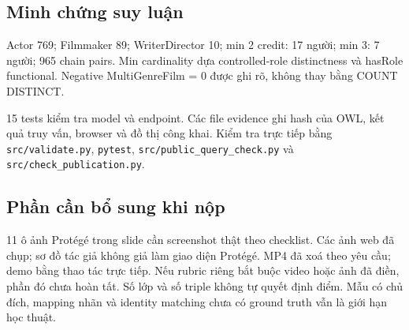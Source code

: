 \documentclass[
  11pt,
]{article}
\begin{document}
\subsection{Minh chứng suy luận}\label{minh-chux1ee9ng-suy-luux1eadn}

Actor 769; Filmmaker 89; Writer\allowbreak{}Di\allowbreak{}rector 10;
min 2 credit: 17 người; min 3: 7 người; 965 chain pairs. Min cardinality
dựa controll\allowbreak{}ed-\allowbreak{}role distinctness và hasRole
functional. Negative
Multi\allowbreak{}Gen\allowbreak{}re\allowbreak{}Film = 0 được ghi rõ,
không thay bằng COUNT DISTINCT.

15 tests kiểm tra model và endpoint. Các file evidence ghi hash của OWL,
kết quả truy vấn, browser và đồ thị công khai. Kiểm tra trực tiếp bằng
\texttt{src/\allowbreak{}vali\allowbreak{}date.\allowbreak{}py},
\texttt{pytest},
\texttt{src/\allowbreak{}publ\allowbreak{}ic\_\allowbreak{}query\allowbreak{}\_\allowbreak{}check.\allowbreak{}p\allowbreak{}y}
và
\texttt{src/\allowbreak{}chec\allowbreak{}k\_\allowbreak{}public\allowbreak{}ation.\allowbreak{}py\allowbreak{}}.

\subsection{Phần cần bổ sung khi
nộp}\label{phux1ea7n-cux1ea7n-bux1ed5-sung-khi-nux1ed9p}

11 ô ảnh Protégé trong slide cần screenshot thật theo checklist. Các ảnh
web đã chụp; sơ đồ tác giả không giả làm giao diện Protégé. MP4 đã xoá
theo yêu cầu; demo bằng thao tác trực tiếp. Nếu rubric riêng bắt buộc
video hoặc ảnh đã điền, phần đó chưa hoàn tất. Số lớp và số triple không
tự quyết định điểm. Mẫu có chủ đích, mapping nhãn và identity matching
chưa có ground truth vẫn là giới hạn học thuật.
\end{document}
